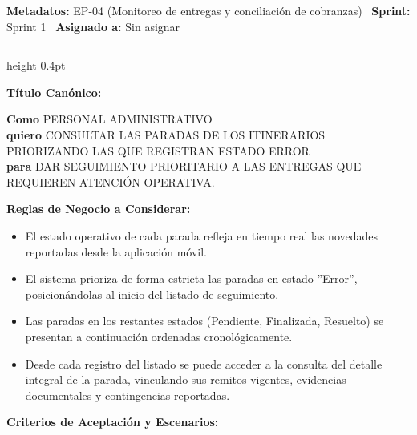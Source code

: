 \documentclass[a4paper,9pt]{article}
\begin{document}
\begin{tcolorbox}[hucard, title={\textbf{HU-17: CONSULTAR ENTREGAS CON PROBLEMAS} \hfill \scriptsize \colorbox{tealstatus}{\textbf{\ Accepted\ }} \quad \colorbox{white}{\textcolor{primarydark}{\textbf{\ 2 pts\ }}}}]
\vspace{-1pt}
\noindent\textbf{\footnotesize Metadatos:} EP-04 (Monitoreo de entregas y conciliación de cobranzas) \textbar\ \textbf{Sprint:} Sprint 1 \textbar\ \textbf{Asignado a:} Sin asignar\par\vspace{2pt}
\hrule height 0.4pt\par\vspace{3pt}
\noindent\textbf{\footnotesize Título Canónico:}\par\vspace{1pt}
{\small \textbf{Como} PERSONAL ADMINISTRATIVO \\ \textbf{quiero} CONSULTAR LAS PARADAS DE LOS ITINERARIOS PRIORIZANDO LAS QUE REGISTRAN ESTADO ERROR \\ \textbf{para} DAR SEGUIMIENTO PRIORITARIO A LAS ENTREGAS QUE REQUIEREN ATENCIÓN OPERATIVA.}\par\vspace{3pt}
\noindent\textbf{\footnotesize Reglas de Negocio a Considerar:}\par\vspace{1pt}
{\footnotesize
\begin{itemize}[leftmargin=12pt, nosep, itemsep=1.5pt, topsep=1pt]
\item El estado operativo de cada parada refleja en tiempo real las novedades reportadas desde la aplicación móvil.
\item El sistema prioriza de forma estricta las paradas en estado ''Error'', posicionándolas al inicio del listado de seguimiento.
\item Las paradas en los restantes estados (Pendiente, Finalizada, Resuelto) se presentan a continuación ordenadas cronológicamente.
\item Desde cada registro del listado se puede acceder a la consulta del detalle integral de la parada, vinculando sus remitos vigentes, evidencias documentales y contingencias reportadas.
\end{itemize}
}\par\vspace{3pt}
\noindent\textbf{\footnotesize Criterios de Aceptación y Escenarios:}\par\vspace{2pt}
{\footnotesize
}
\end{tcolorbox}
\end{document}
